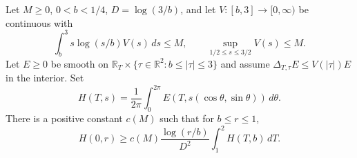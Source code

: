 Let \(M\ge0\), \(0<b<1/4\), \(D=\log(3/b)\), and let
\(V:[b,3]\to[0,\infty)\) be continuous with
\[
 \int_b^3 s\log(s/b)V(s)\,ds\le M,\qquad
 \sup_{1/2\le s\le3/2}V(s)\le M .
\]
Let \(E\ge0\) be smooth on
\(\mathbb R_T\times\{\tau\in\mathbb R^2:b\le|\tau|\le3\}\) and
assume \(\Delta_{T,\tau}E\le V(|\tau|)E\) in the interior.
Set
\[
 H(T,s)=\frac1{2\pi}\int_0^{2\pi}
    E(T,s(\cos\theta,\sin\theta))\,d\theta .
\]
There is a positive constant \(c(M)\) such that for \(b\le r\le1\),
\[
 H(0,r)\ge c(M)\frac{\log(r/b)}{D^2}\int_1^2H(T,b)\,dT .
\]
